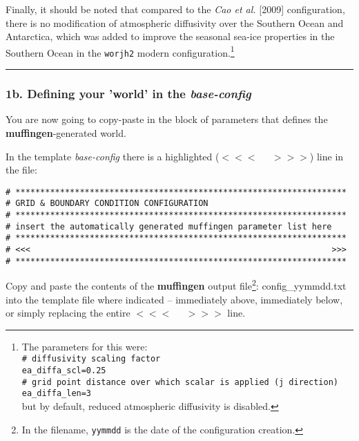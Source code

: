 \documentclass[11pt,fleqn]{book} %
\begin{document}
\begin{itemize}[noitemsep]
Finally, it should be noted that compared to the \textit{Cao et al.} [2009] configuration, there is no modification of atmospheric diffusivity over the Southern Ocean and Antarctica, which was added to improve the seasonal sea-ice properties in the Southern Ocean in the \texttt{worjh2} modern configuration.\footnote{The parameters for this were:
\\\texttt{\# diffusivity scaling factor}
\\\texttt{ea\_diffa\_scl=0.25}
\\\texttt{\# grid point distance over which scalar is applied (j direction)}
\\\texttt{ea\_diffa\_len=3}
\\but by default, reduced atmospheric diffusivity is disabled.}

\end{itemize}
\vspace{1mm}

%
\noindent\rule{4cm}{0.5pt}
\subsubsection{1b. Defining your 'world' in the \textit{base-config}}

You are now going to copy-paste in the block of parameters that defines the \textbf{muffingen}-generated world.

In the template \textit{base-config} there is a highlighted (\(<<<\;\;\;\;\;>>>\)) line in the  file:
\footnotesize\vspace{-2pt}\begin{verbatim}
# *******************************************************************
# GRID & BOUNDARY CONDITION CONFIGURATION
# *******************************************************************
# insert the automatically generated muffingen parameter list here
# *******************************************************************
# <<<                                                             >>>
# *******************************************************************
\end{verbatim}\vspace{-2pt}\normalsize

Copy and paste the contents of the \textbf{muffingen} output file\footnote{In the filename, \texttt{yymmdd} is the date of the configuration creation.}: \textsf{\footnotesize config\_yymmdd.txt}
into the template file where indicated -- immediately above, immediately below, or simply replacing the entire \(<<<\;\;\;\;\;>>>\) line.
\end{document}
